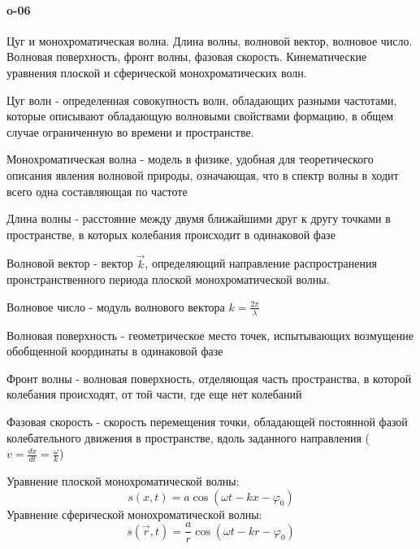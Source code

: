 


\paragraph{o-06}
Цуг и монохроматическая волна. Длина волны, волновой вектор, волновое число. Волновая поверхность, фронт волны, фазовая скорость. Кинематические уравнения плоской и сферической монохроматических волн.

\begin{definition}
Цуг волн - определенная совокупность волн, обладающих разными частотами, которые описывают обладающую волновыми свойствами формацию, в общем случае ограниченную во времени и пространстве.
\end{definition}
\begin{definition}
Монохроматическая волна - модель в физике, удобная для теоретического описания явления волновой природы, означающая, что в спектр волны в ходит всего одна составляющая по частоте 
\end{definition}
\begin{definition}
Длина волны - расстояние между двумя ближайшими друг к другу точками в пространстве, в которых колебания происходит в одинаковой фазе
\end{definition}
\begin{definition}
Волновой вектор - вектор $\vec k$, определяющий направление распространения пронстранственного периода плоской монохроматической волны.
\end{definition}
\begin{definition}
Волновое число - модуль волнового вектора $k = \frac{2\pi}{\lambda}$
\end{definition}
\begin{definition}
Волновая поверхность - геометрическое место точек, испытывающих возмущение обобщенной координаты в одинаковой фазе
\end{definition}
\begin{definition}
Фронт волны - волновая поверхность, отделяющая часть пространства, в которой колебания происходят, от той части, где еще нет колебаний
\end{definition}
\begin{definition}
Фазовая скорость - скорость перемещения точки, обладающей постоянной фазой колебательного движения в пространстве, вдоль заданного направления ($v = \frac{dx}{dt} = \frac{\omega}{k}$)
\end{definition}
Уравнение плоской монохроматической волны:
$$s(x, t) = a\cos(\omega t - kx - \varphi_0)$$
Уравнение сферической монохроматической волны:
$$s(\vec r, t) = \frac{a}{r}\cos(\omega t - kr - \varphi_0)$$

 
